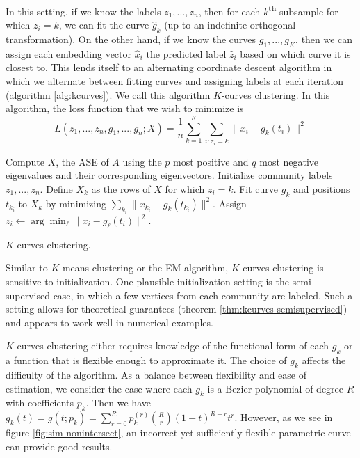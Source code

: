 \documentclass[
  12pt,
]{article}
\theoremstyle{definition}
\theoremstyle{definition}
\theoremstyle{definition}
\theoremstyle{definition}
\theoremstyle{remark}
\begin{document}
In this setting, if we know the labels \(z_1, ..., z_n\), then for each \(k\)\textsuperscript{th} subsample for which \(z_i = k\), we can fit the curve \(\hat{g}_k\) (up to an indefinite orthogonal transformation).
On the other hand, if we know the curves \(g_1, ..., g_K\), then we can assign each embedding vector \(\hat{x}_i\) the predicted label \(\hat{z}_i\) based on which curve it is closest to.
This lends itself to an alternating coordinate descent algorithm in which we alternate between fitting curves and assigning labels at each iteration (algorithm \ref{alg:kcurves}).
We call this algorithm \(K\)-curves clustering.
In this algorithm, the loss function that we wish to minimize is
\begin{equation}
\label{eq:kcurves-loss}
L(z_1, ..., z_n, g_1, ..., g_n; X) = \frac{1}{n} \sum_{k=1}^K \sum_{i: z_i = k} \|x_i - g_k(t_i)\|^2
\end{equation}

\begin{algorithm}[h]
\label{alg:kcurves}
\DontPrintSemicolon
\SetAlgoLined
{}
Compute $X$, the ASE of $A$ using the $p$ most positive and $q$ most negative eigenvalues and their corresponding eigenvectors.\;
Initialize community labels $z_1, ..., z_n$.\;
 {
 {
Define $X_k$ as the rows of $X$ for which $z_i = k$.\;
Fit curve $g_k$ and positions $t_{k_i}$ to $X_k$ by minimizing $\sum_{k_i} \|x_{k_i} - g_k(t_{k_i})\|^2$.\;
}
 {
Assign $z_i \leftarrow \arg\min_\ell \|x_i - g_\ell(t_i)\|^2$.\;
}
}
\caption{$K$-curves clustering.}
\end{algorithm}

Similar to \(K\)-means clustering or the EM algorithm, \(K\)-curves clustering is sensitive to initialization.
One plausible initialization setting is the semi-supervised case, in which a few vertices from each community are labeled.
Such a setting allows for theoretical guarantees (theorem \ref{thm:kcurves-semisupervised}) and appears to work well in numerical examples.

\(K\)-curves clustering either requires knowledge of the functional form of each \(g_k\) or a function that is flexible enough to approximate it.
The choice of \(g_k\) affects the difficulty of the algorithm.
As a balance between flexibility and ease of estimation, we consider the case where each \(g_k\) is a Bezier polynomial of degree \(R\) with coefficients \(p_k\).
Then we have \(g_k(t) = g(t; p_k) = \sum_{r=0}^R p_k^{(r)} \binom{R}{r} (1-t)^{R-r} t^r\).
However, as we see in figure \ref{fig:sim-nonintersect}, an incorrect yet sufficiently flexible parametric curve can provide good results.
\end{document}
